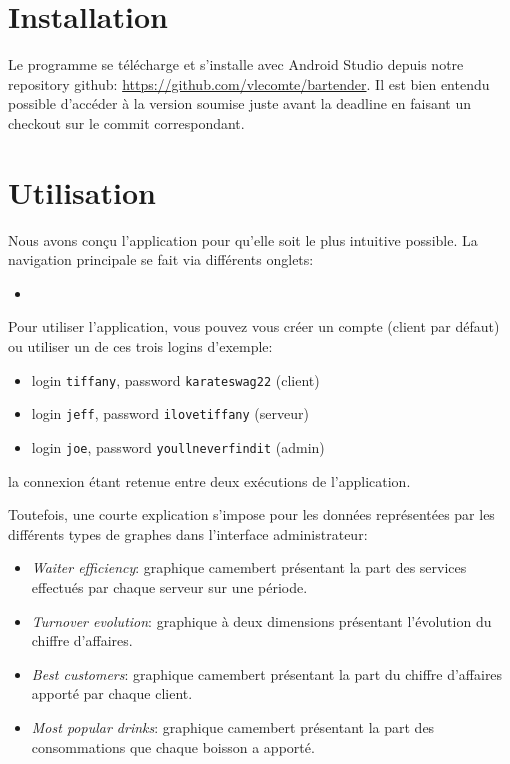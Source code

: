 \documentclass[a4paper,10pt]{article}
\begin{document}

\section{Installation}

Le programme se télécharge et s'installe avec Android Studio depuis notre repository github:
\url{https://github.com/vlecomte/bartender}.
Il est bien entendu possible d'accéder à la version soumise juste avant la deadline en faisant un checkout sur le commit correspondant.

\section{Utilisation}

Nous avons conçu l'application pour qu'elle soit le plus intuitive possible. La navigation principale se fait via différents onglets:
\begin{itemize}
    \item
\end{itemize}

Pour utiliser l'application, vous pouvez vous créer un compte (client par défaut) ou utiliser un de ces trois logins d'exemple:
\begin{itemize}
    \item login \texttt{tiffany}, password \texttt{karateswag22} (client)
    \item login \texttt{jeff}, password \texttt{ilovetiffany} (serveur)
    \item login \texttt{joe}, password \texttt{youllneverfindit} (admin)
\end{itemize}
la connexion étant retenue entre deux exécutions de l'application.

Toutefois, une courte explication s'impose pour les données représentées par les différents types de graphes dans l'interface administrateur:
\begin{itemize}
    \item \emph{Waiter efficiency}: graphique camembert présentant la part des services effectués par chaque serveur sur une période.
    \item \emph{Turnover evolution}: graphique à deux dimensions présentant l'évolution du chiffre d'affaires.
    \item \emph{Best customers}: graphique camembert présentant la part du chiffre d'affaires apporté par chaque client.
    \item \emph{Most popular drinks}: graphique camembert présentant la part des consommations que chaque boisson a apporté.
\end{itemize}
\end{document}
